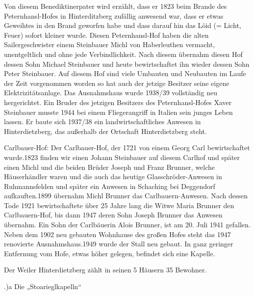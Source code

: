 \documentclass{book}
\begin{document}
Von diesem Benediktinerpater wird erzählt, dass er 1823 beim Brande des
Peternhansl-Hofes in Hinterditzberg zufällig anwesend war, dass er etwas
Geweihtes in den Brand geworfen habe und dass darauf hin das Löid (= Licht,
Feuer) sofort kleiner wurde. Diesen Peternhansl-Hof haben die alten
Sailergeschwister einem Steinbauer Michl von Haberleuthen vermacht,
unentgeltlich und ohne jede Verbindlichkeit. Nach diesem übernahm diesen Hof
dessen Sohn Michael Steinbauer und heute bewirtschaftet ihn wieder dessen Sohn
Peter Steinbauer. Auf diesem Hof sind viele Umbauten und Neubauten im Laufe der
Zeit vorgenommen worden so hat auch der jetzige Besitzer seine eigene
Elektrizitätsanlage. Das Ausnahmshaus wurde 1938/39 vollständig neu
hergerichtet. Ein Bruder des jetzigen Besitzers des Peternhansl-Hofes Xaver
Steinbauer musste 1944 bei einem Fliegerangriff in Italien sein junges Leben
lassen. Er baute sich 1937/38 ein landwirtschaftliches Anwesen in
Hinterdietzberg, das außerhalb der Ortschaft Hinterdietzberg steht.

Carlbauer-Hof: Der Carlbauer-Hof, der 1721 von einem Georg Carl bewirtschaftet
wurde.1823 finden wir einen Johann Steinbauer auf diesem Carlhof und später
einen Michl und die beiden Brüder Joseph und Franz Brunner, welche Häuserhändler
waren und die auch das heutige Glasschröder-Anwesen in Ruhmannsfelden und später
ein Anwesen in Schaching bei Deggendorf aufkauften.1899 übernahm Michl Brunner
das Carlbauern-Anwesen. Nach dessen Tode 1921 bewirtschaftete über 25 Jahre lang
die Witwe Maria Brunner den Carlbauern-Hof, bis dann 1947 deren Sohn Joseph
Brunner das Anwesen übernahm. Ein Sohn der Carlbäuerin Alois Brunner, ist am 20.
Juli 1941 gefallen. Neben dem 1902 neu gebauten Wohnhause des großen Hofes steht
das 1947 renovierte Ausnahmshaus.1949 wurde der Stall neu gebaut. In ganz
geringer Entfernung vom Hofe, etwas höher gelegen, befindet sich eine Kapelle.

Der Weiler Hinterdietzberg zählt in seinen 5 Häusern 35 Bewohner.

.)a Die „Stoarieglkapelln“
\end{document}
